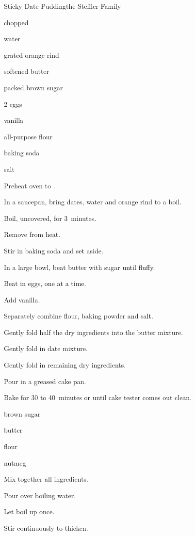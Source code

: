 \begin{recipe}{Sticky Date Pudding}{the Steffler Family}{}

\begin{ingredients}
\item \C{1\threequarter} chopped 
\item {} water
\item {} grated orange rind
\item \C{\half} softened butter
\item \C{\third} packed brown sugar
\item 2 eggs
\item {} vanilla
\item \C{1\quarter} all-purpose flour
\item {} baking soda
\item \tp{\half} salt
\end{ingredients}

\begin{directions}
\item Preheat oven to .
\item In a saucepan, bring dates, water and orange rind to a boil.
\item Boil, uncovered, for 3~minutes.
\item Remove from heat.
\item Stir in baking soda and set aside.
\item In a large bowl, beat butter with sugar until fluffy.
\item Beat in eggs, one at a time.
\item Add vanilla.
\item Separately combine flour, baking powder and salt.
\item Gently fold half the dry ingredients into the butter mixture.
\item Gently fold in date mixture.
\item Gently fold in remaining dry ingredients.
\item Pour in a greased cake pan.
\item Bake for 30 to 40~minutes or until cake tester comes out clean.
\end{directions}


\begin{ingredients}
\item {} brown sugar
\item {} butter
\item {} flour
\item nutmeg
\end{ingredients}

\begin{directions}
\item Mix together all ingredients.
\item Pour over  boiling water.
\item Let boil up once.
\item Stir continuously to thicken.
\end{directions}
\end{recipe}
